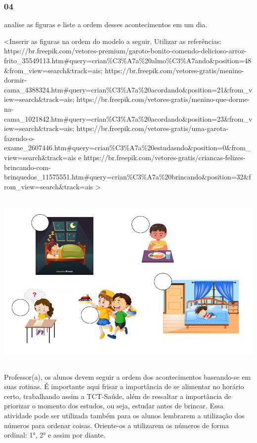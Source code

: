 \subsubsection{04}\label{section-42}

analise as figuras e liste a ordem desses acontecimentos em um dia.

\textless{}Inserir as figuras na ordem do modelo a seguir. Utilizar as
referências:
https://br.freepik.com/vetores-premium/garoto-bonito-comendo-delicioso-arroz-frito\_35549113.htm\#query=crian\%C3\%A7a\%20almo\%C3\%A7ando\&position=48\&from\_view=search\&track=ais;
https://br.freepik.com/vetores-gratis/menino-dormir-cama\_4388324.htm\#query=crian\%C3\%A7a\%20acordando\&position=21\&from\_view=search\&track=ais;
https://br.freepik.com/vetores-gratis/menino-que-dorme-na-cama\_1021842.htm\#query=crian\%C3\%A7a\%20acordando\&position=23\&from\_view=search\&track=ais;
https://br.freepik.com/vetores-gratis/uma-garota-fazendo-o-exame\_2607446.htm\#query=crian\%C3\%A7a\%20estudasndo\&position=0\&from\_view=search\&track=ais
e
https://br.freepik.com/vetores-gratis/criancas-felizes-brincando-com-brinquedos\_11575551.htm\#query=crian\%C3\%A7a\%20brincando\&position=32\&from\_view=search\&track=ais
\textgreater{}

\includegraphics[width=5.90556in,height=3.46597in]{media/image36.png}

Professor(a), os alunos devem seguir a ordem dos acontecimentos
baseando-se em suas rotinas. É importante aqui frisar a importância de
se alimentar no horário certo, trabalhando assim a TCT-Saúde, além de
ressaltar a importância de priorizar o momento dos estudos, ou seja,
estudar antes de brincar. Essa atividade pode ser utilizada também para
os alunos lembrarem a utilização dos números para ordenar coisas.
Oriente-os a utilizarem os números de forma ordinal: 1°, 2° e assim por
diante.

